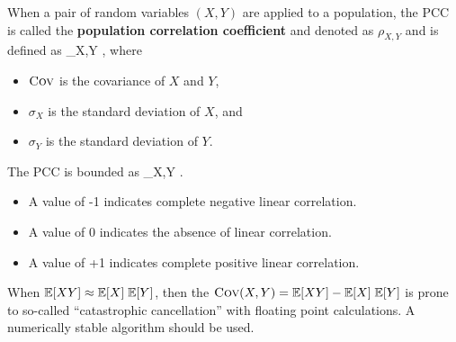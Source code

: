 When a pair of random variables $(X,Y)$ are applied to a population, the PCC
is called the {\bf population correlation coefficient} and denoted as 
$\rho_{X,Y}$ and is defined as 
\be
\rho_{X,Y}  {}, 
\label{eq:pearson_corr_coef}
\ee
where 
\begin{itemize}
\item $\mbox{\sc Cov}$ is the covariance of $X$ and $Y$, 
\item $\sigma_X$ is the standard deviation of $X$, and 
\item $\sigma_Y$ is the standard deviation of $Y$.
\end{itemize}
The PCC is bounded as
 \leq \rho_{X,Y} .
\ee
\begin{itemize}
\item A value of -1 indicates complete negative linear correlation.
\item A value of  0 indicates the absence of linear correlation.
\item A value of +1 indicates complete positive linear correlation.
\end{itemize}

\begin{Hremark}
	When $\mathbb{E}[XY] \approx \mathbb{E}[X] \; \mathbb{E}[Y]$, 
	then the $\mbox{\sc Cov}(X,Y) = \mathbb{E}[XY] - \mathbb{E}[X] \; \mathbb{E}[Y]$ 
	is prone to so-called ``catastrophic 
	cancellation'' with floating point
	calculations.  A numerically stable algorithm 
	should be used.
\end{Hremark}
